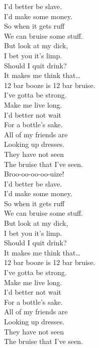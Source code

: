I'd better be slave. \\
I'd make some money. \\
So when it gets ruff \\
We can bruise some stuff. \\

But look at my dick, \\
I bet you it's limp. \\
Should I quit drink? \\
It makes me think that… \\

12 bar booze is 12 bar bruise. \\

I've gotta be strong. \\
Make me live long. \\
I'd better not wait \\
For a bottle's sake. \\

All of my friends are \\
Looking up dresses. \\
They have not seen \\
The bruise that I've seen. \\

Broo-oo-oo-oo-uize! \\

I'd better be slave. \\
I'd make some money. \\
So when it gets ruff \\
We can bruise some stuff. \\

But look at my dick, \\
I bet you it's limp. \\
Should I quit drink? \\
It makes me think that… \\

12 bar booze is 12 bar bruise. \\

I've gotta be strong. \\
Make me live long. \\
I'd better not wait \\
For a bottle's sake. \\

All of my friends are \\
Looking up dresses. \\
They have not seen \\
The bruise that I've seen. \\

